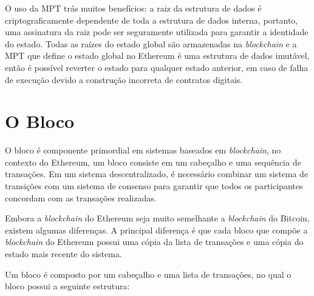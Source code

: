 \documentclass[tcc,capa]{texufpel}
\begin{document}
	O uso da MPT trás muitos benefícios: a raiz da estrutura de dados é criptograficamente dependente de toda a estrutura de dados interna, portanto, uma assinatura da raiz pode ser seguramente utilizada para garantir a identidade do estado. Todas as raízes do estado global são armazenadas na \textit{blockchain} e a MPT que define o estado global no Ethereum é uma estrutura de dados imutável, então é possível reverter o estado para qualquer estado anterior, em caso de falha de execução devido a construção incorreta de contratos digitais.
	
	
	\section{O Bloco}
	
	O bloco é componente primordial em sistemas baseados em \textit{blockchain}, no contexto do Ethereum, um bloco consiste em um cabeçalho e uma sequência de transações. Em um sistema descentralizado, é necessário combinar um sistema de transições com um sistema de consenso para garantir que todos os participantes concordam com as transações realizadas.
	
	Embora a \textit{blockchain} do Ethereum seja muito semelhante a \textit{blockchain} do Bitcoin, existem algumas diferenças. A principal diferença é que cada bloco que compõe a \textit{blockchain} do Ethereum possui uma cópia da lista de transações e uma cópia do estado mais recente do sistema.
	
	Um bloco é composto por um cabeçalho e uma lista de transações, no qual o bloco possui a seguinte estrutura:
	
\end{document}
